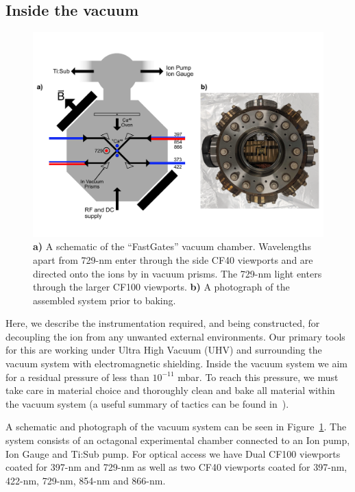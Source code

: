 \documentclass[12pt]{iopart}
\begin{document}
\subsection{Inside the vacuum}

\begin{figure}
  \begin{center}
   \noindent\includegraphics[width=\linewidth]{figures/vacuum_can.pdf}
  \end{center}
  \caption{
    \textbf{a)} A schematic of the ``FastGates'' vacuum
    chamber. Wavelengths apart from 729-nm enter through the side CF40
    viewports and are directed onto the ions by in vacuum prisms. The
    729-nm light enters through the larger CF100 viewports.
    \textbf{b)} A photograph of the assembled system prior to baking.
  }
  \label{fig:can}
\end{figure}

Here, we describe the instrumentation required, and being constructed,
for decoupling the ion from any unwanted external environments. Our
primary tools for this are working under Ultra High Vacuum (UHV) and
surrounding the vacuum system with electromagnetic shielding. Inside
the vacuum system we aim for a residual pressure of less than
$10^{-11}$ mbar. To reach this pressure, we must take care in material
choice and thoroughly clean and bake all material within the vacuum
system (a useful summary of tactics can be found in~\cite{birnbaum_ultra-high_2005, wolf_cryogenic_2015}).

A schematic and photograph of the vacuum system can be seen in
Figure~\ref{fig:can}. The system consists of an octagonal experimental
chamber connected to an Ion pump, Ion Gauge and Ti:Sub pump. For
optical access we have Dual CF100 viewports coated for 397-nm and
729-nm as well as two CF40 viewports coated for 397-nm, 422-nm,
729-nm, 854-nm and 866-nm.
\end{document}
